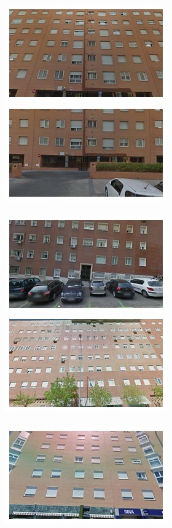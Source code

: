 \begin{figure}
\begin{minipage}{\linewidth}
\begin{minipage}{0.3\linewidth}
      \includegraphics[width=0.49\linewidth]{imgs/arch/mosaicsS3/mosaic0002.jpg}
      \includegraphics[width=0.49\linewidth]{imgs/arch/mosaicsS3/mosaic0003.jpg}
      \\ \vspace{-3mm} \\
      \includegraphics[width=0.49\linewidth]{imgs/arch/mosaicsS3/mosaic0004.jpg}
      \includegraphics[width=0.49\linewidth]{imgs/arch/mosaicsS3/mosaic0005.jpg}
      \\ \vspace{-3mm} \\
      \includegraphics[width=0.49\linewidth]{imgs/arch/mosaicsS3/mosaic0006.jpg}

\end{minipage}
\end{minipage}
\end{figure}
